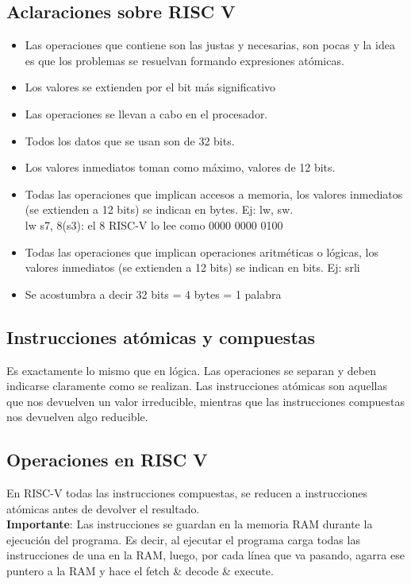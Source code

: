 \documentclass[10pt,a4paper]{article}
\begin{document}
\subsection*{Aclaraciones sobre RISC V}
\begin{itemize}
    \item Las operaciones que contiene son las justas y necesarias, son pocas y la idea es que los problemas se resuelvan formando expresiones atómicas. 
    \item Los valores se extienden por el bit más significativo
    \item Las operaciones se llevan a cabo en el procesador.
    \item Todos los datos que se usan son de 32 bits.
    \item Los valores inmediatos toman como máximo, valores de 12 bits.
    \item Todas las operaciones que implican accesos a memoria, los valores inmediatos (se extienden a 12 bits) se indican en bytes. Ej: lw, sw. \\
    lw s7, 8(s3): el 8 RISC-V lo lee como 0000 0000 0100
    \item Todas las operaciones que implican operaciones aritméticas o lógicas, los valores inmediatos (se extienden a 12 bits) se indican en bits. Ej: srli
    \item Se acostumbra a decir 32 bits = 4 bytes = 1 palabra
\end{itemize}
\subsection*{Instrucciones atómicas y compuestas}
Es exactamente lo mismo que en lógica. Las operaciones se separan y deben indicarse claramente como se realizan.
Las instrucciones atómicas son aquellas que nos devuelven un valor irreducible, mientras que las instrucciones compuestas nos devuelven algo reducible. 
\subsection*{Operaciones en RISC V}
En RISC-V todas las instrucciones compuestas, se reducen a instrucciones atómicas antes de devolver el resultado. \\

\textbf{Importante}: Las instrucciones se guardan en la memoria RAM durante la ejecución del programa. Es decir, al ejecutar el programa carga todas las instrucciones de una en la RAM, luego, por cada línea que va pasando, agarra ese puntero a la RAM y hace el fetch \& decode \& execute.  \\
\end{document}

